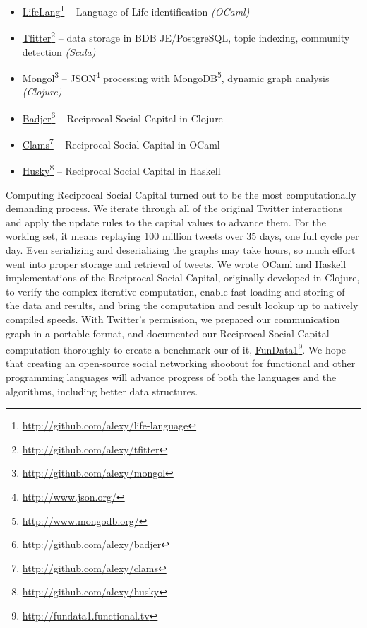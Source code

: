 \documentclass[10pt,oneside]{memoir}
\begin{document}
\begin{itemize}


\item \href{http://github.com/alexy/life-language}{LifeLang}\footnote{\href{http://github.com/alexy/life-language}{http://github.com/alexy/life-language}} -- Language of Life identification {\itshape (OCaml)}

\item \href{http://github.com/alexy/tfitter}{Tfitter}\footnote{\href{http://github.com/alexy/tfitter}{http://github.com/alexy/tfitter}} \cite{code:tfitter} -- data storage in BDB JE/PostgreSQL, topic indexing, community detection {\itshape (Scala)}

\item \href{http://github.com/alexy/mongol}{Mongol}\footnote{\href{http://github.com/alexy/mongol}{http://github.com/alexy/mongol}} -- \href{http://www.json.org/}{JSON}\footnote{\href{http://www.json.org/}{http://www.json.org/}} processing with \href{http://www.mongodb.org/}{MongoDB}\footnote{\href{http://www.mongodb.org/}{http://www.mongodb.org/}}, dynamic graph analysis {\itshape (Clojure)}

\item \href{http://github.com/alexy/badjer}{Badjer}\footnote{\href{http://github.com/alexy/badjer}{http://github.com/alexy/badjer}} -- Reciprocal Social Capital in Clojure

\item \href{http://github.com/alexy/clams}{Clams}\footnote{\href{http://github.com/alexy/clams}{http://github.com/alexy/clams}} -- Reciprocal Social Capital in OCaml

\item \href{http://github.com/alexy/husky}{Husky}\footnote{\href{http://github.com/alexy/husky}{http://github.com/alexy/husky}} -- Reciprocal Social Capital in Haskell
\end{itemize}

Computing Reciprocal Social Capital turned out to be the most computationally demanding process.  We iterate through all of the original Twitter interactions and apply the update rules to the capital values to advance them.  For the working set, it means replaying 100 million tweets over 35 days, one full cycle per day.  Even serializing and deserializing the graphs may take hours, so much effort went into proper storage and retrieval of tweets.  We wrote OCaml and Haskell implementations of the Reciprocal Social Capital, originally developed in Clojure, to verify the complex iterative computation, enable fast loading and storing of the data and results, and bring the computation and result lookup up to natively compiled speeds.  With Twitter's permission, we prepared our communication graph in a portable format, and documented our Reciprocal Social Capital computation thoroughly to create a benchmark our of it, \href{http://fundata1.functional.tv}{FunData1}\footnote{\href{http://fundata1.functional.tv}{http://fundata1.functional.tv}}.  We hope that creating an open-source social networking shootout for functional and other programming languages will advance progress of both the languages and the algorithms, including better data structures.
\end{document}
